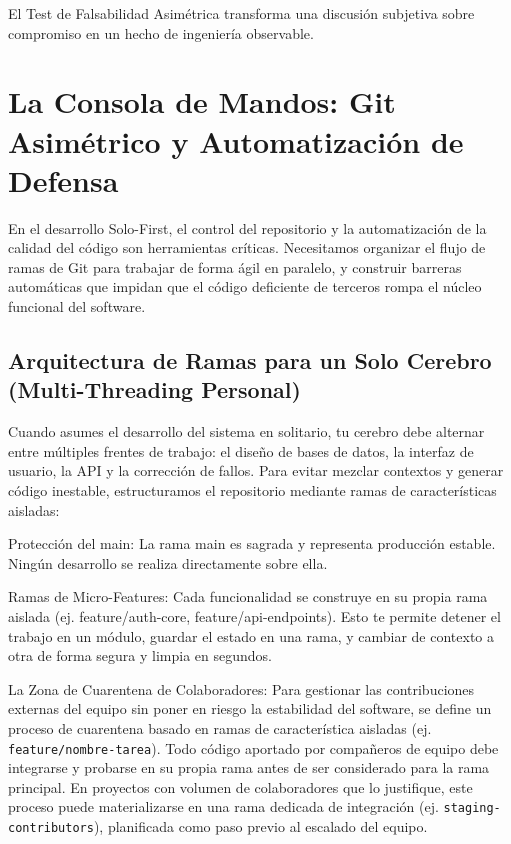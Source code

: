 \documentclass[14pt,a4paper,oneside]{extbook}
\begin{document}
El Test de Falsabilidad Asimétrica transforma una discusión subjetiva sobre compromiso en un hecho de ingeniería observable.


\chapter{La Consola de Mandos: Git Asimétrico y Automatización de Defensa}

En el desarrollo Solo-First, el control del repositorio y la automatización de la calidad del código son herramientas críticas. Necesitamos organizar el flujo de ramas de Git para trabajar de forma ágil en paralelo, y construir barreras automáticas que impidan que el código deficiente de terceros rompa el núcleo funcional del software.

\section{Arquitectura de Ramas para un Solo Cerebro (Multi-Threading Personal)}

Cuando asumes el desarrollo del sistema en solitario, tu cerebro debe alternar entre múltiples frentes de trabajo: el diseño de bases de datos, la interfaz de usuario, la API y la corrección de fallos. Para evitar mezclar contextos y generar código inestable, estructuramos el repositorio mediante ramas de características aisladas:

Protección del main: La rama main es sagrada y representa producción estable. Ningún desarrollo se realiza directamente sobre ella.

Ramas de Micro-Features: Cada funcionalidad se construye en su propia rama aislada (ej. feature/auth-core, feature/api-endpoints). Esto te permite detener el trabajo en un módulo, guardar el estado en una rama, y cambiar de contexto a otra de forma segura y limpia en segundos.

La Zona de Cuarentena de Colaboradores: Para gestionar las contribuciones externas del equipo sin poner en riesgo la estabilidad del software, se define un proceso de cuarentena basado en ramas de característica aisladas (ej. \texttt{feature/nombre-tarea}). Todo código aportado por compañeros de equipo debe integrarse y probarse en su propia rama antes de ser considerado para la rama principal. En proyectos con volumen de colaboradores que lo justifique, este proceso puede materializarse en una rama dedicada de integración (ej. \texttt{staging-contributors}), planificada como paso previo al escalado del equipo.
\end{document}
